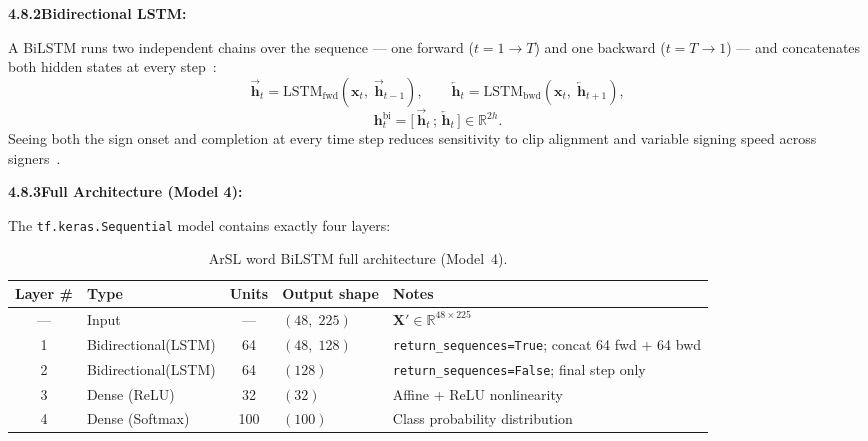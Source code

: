 \noindent\textbf{4.8.2\quad Bidirectional LSTM:}\par
{}
\vspace{0.3cm}

\noindent A BiLSTM runs two independent chains over the sequence --- one forward ($t{=}1\!\to\!T$) and one backward ($t{=}T\!\to\!1$) --- and concatenates both hidden states at every step~\cite{schuster1997bidirectional}:
\begin{equation}
\overrightarrow{\mathbf{h}}_t = \mathrm{LSTM}_{\text{fwd}}(\mathbf{x}_t,\;\overrightarrow{\mathbf{h}}_{t-1}), \qquad \overleftarrow{\mathbf{h}}_t = \mathrm{LSTM}_{\text{bwd}}(\mathbf{x}_t,\;\overleftarrow{\mathbf{h}}_{t+1}),
\label{eq:ch4-bilstm-passes}
\end{equation}
\begin{equation}
\mathbf{h}_t^{\text{bi}} = \bigl[\,\overrightarrow{\mathbf{h}}_t\,;\,\overleftarrow{\mathbf{h}}_t\,\bigr] \in \mathbb{R}^{2h}.
\label{eq:ch4-bilstm-concat}
\end{equation}
Seeing both the sign onset and completion at every time step reduces sensitivity to clip alignment and variable signing speed across signers~\cite{schuster1997bidirectional}.\par\vspace{0.3cm}
\clearpage
\noindent\textbf{4.8.3\quad Full Architecture (Model 4):}\par
\vspace{0.2cm}

\noindent The \texttt{tf.keras.Sequential} model contains exactly four layers:\par\vspace{0.3cm}

\begin{table}[H]
\centering
\caption{ArSL word BiLSTM full architecture (Model~4).}
\label{tab:ch4-bilstm-arch}
\small
\renewcommand{\arraystretch}{1.4} %
\begin{tabular}{|c|P{3.8cm}|c|P{2.4cm}|P{4.0cm}|}
\hline
\textbf{Layer \#} & \textbf{Type} & \textbf{Units} & \textbf{Output shape} & \textbf{Notes} \\ \hline
--- & Input & --- & $(48,\;225)$ & $\mathbf{X}' \in \mathbb{R}^{48 \times 225}$ \\  & Bidirectional(LSTM) & 64 & $(48,\;128)$ & \texttt{return\_\allowbreak sequences=True}; concat 64 fwd + 64 bwd \\  & Bidirectional(LSTM) & 64 & $(128)$ & \texttt{return\_\allowbreak sequences=False}; final step only \\  & Dense (ReLU) & 32 & $(32)$ & Affine + ReLU nonlinearity \\  & Dense (Softmax) & 100 & $(100)$ & Class probability distribution \\ \hline
\end{tabular}
\end{table}
\vspace{0.1cm} %

